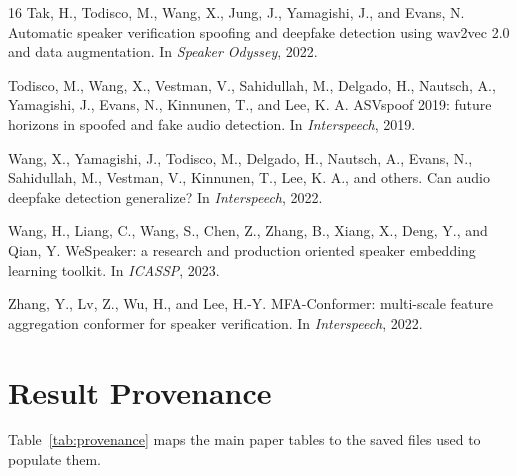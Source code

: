 \documentclass{article}
\begin{document}
\begin{thebibliography}{16}
Tak, H., Todisco, M., Wang, X., Jung, J., Yamagishi, J., and Evans, N.
\newblock Automatic speaker verification spoofing and deepfake detection using
wav2vec 2.0 and data augmentation.
\newblock In \emph{Speaker Odyssey}, 2022.

Todisco, M., Wang, X., Vestman, V., Sahidullah, M., Delgado, H., Nautsch, A.,
Yamagishi, J., Evans, N., Kinnunen, T., and Lee, K. A.
\newblock ASVspoof 2019: future horizons in spoofed and fake audio detection.
\newblock In \emph{Interspeech}, 2019.

Wang, X., Yamagishi, J., Todisco, M., Delgado, H., Nautsch, A., Evans, N.,
Sahidullah, M., Vestman, V., Kinnunen, T., Lee, K. A., and others.
\newblock Can audio deepfake detection generalize?
\newblock In \emph{Interspeech}, 2022.

Wang, H., Liang, C., Wang, S., Chen, Z., Zhang, B., Xiang, X., Deng, Y., and
Qian, Y.
\newblock WeSpeaker: a research and production oriented speaker embedding
learning toolkit.
\newblock In \emph{ICASSP}, 2023.

Zhang, Y., Lv, Z., Wu, H., and Lee, H.-Y.
\newblock MFA-Conformer: multi-scale feature aggregation conformer for speaker
verification.
\newblock In \emph{Interspeech}, 2022.

\end{thebibliography}

\appendix

\section{Result Provenance}
\label{app:provenance}

Table~\ref{tab:provenance} maps the main paper tables to the saved files used
to populate them.
\end{document}

